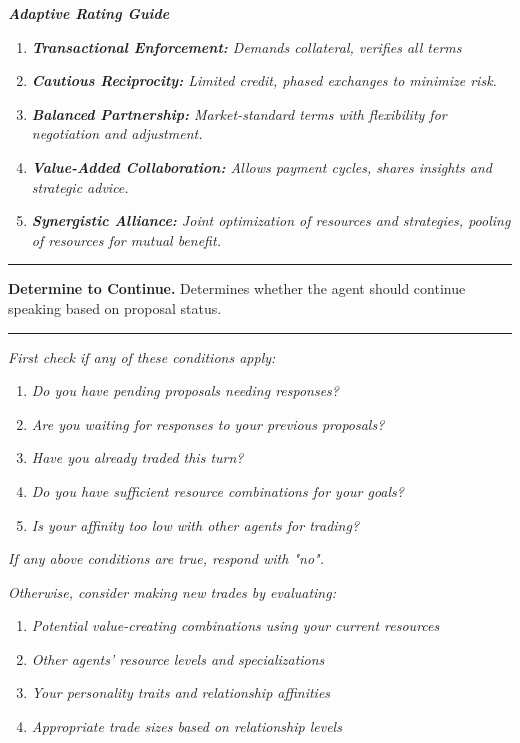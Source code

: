 \textbf{\textit{Adaptive Rating Guide}}
\begin{enumerate}
    \item \textit{\textbf{Transactional Enforcement:} Demands collateral, verifies all terms}
    \item \textit{\textbf{Cautious Reciprocity:} Limited credit, phased exchanges to minimize risk.}
    \item \textit{\textbf{Balanced Partnership:} Market-standard terms with flexibility for negotiation and adjustment.}
    \item \textit{\textbf{Value-Added Collaboration:} Allows payment cycles, shares insights and strategic advice.}
    \item \textit{\textbf{Synergistic Alliance:} Joint optimization of resources and strategies, pooling of resources for mutual benefit.}
\end{enumerate} 
\noindent\rule{\linewidth}{0.8pt}


\textbf{Determine to Continue.} Determines whether the agent should continue speaking based on proposal status.
\noindent\rule{\linewidth}{0.8pt}
\textit{First check if any of these conditions apply:}
\begin{enumerate}
    \item \textit{Do you have pending proposals needing responses?}
    \item \textit{Are you waiting for responses to your previous proposals?}
    \item \textit{Have you already traded this turn?}
    \item \textit{Do you have sufficient resource combinations for your goals?}
    \item \textit{Is your affinity too low with other agents for trading?}
\end{enumerate}

\textit{If any above conditions are true, respond with "no".}

\textit{Otherwise, consider making new trades by evaluating:}
\begin{enumerate}
    \item \textit{Potential value-creating combinations using your current resources}
    \item \textit{Other agents' resource levels and specializations}
    \item \textit{Your personality traits and relationship affinities}
    \item \textit{Appropriate trade sizes based on relationship levels}
\end{enumerate}

